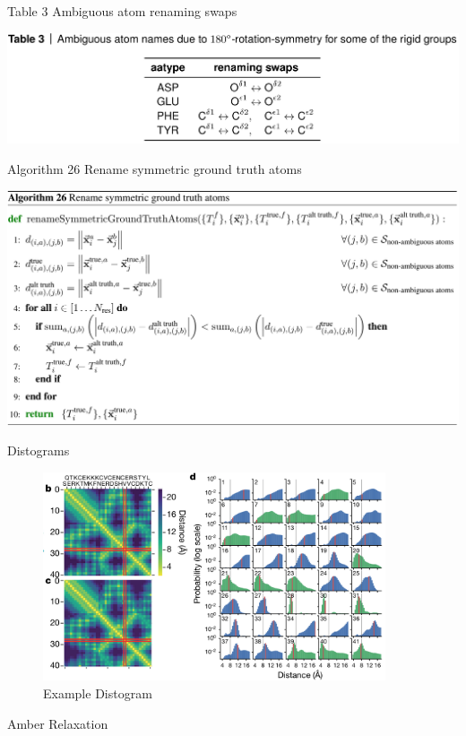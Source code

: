 \documentclass[presentation, smaller]{beamer}
\begin{document}
\begin{frame}[label={sec:orge876001}]{Table 3 Ambiguous atom renaming swaps \cite{jumperHighlyAccurateProtein2021}}
\begin{center}
\includegraphics[width=\textwidth]{./imgs/table3_atom_renaming.png}
\end{center}
\end{frame}

\begin{frame}[label={sec:org96c8ffd}]{Algorithm 26 Rename symmetric ground truth atoms \cite{jumperHighlyAccurateProtein2021}}
\begin{center}
\includegraphics[width=.9\linewidth]{./imgs/algo26_rename-truth-atoms.png}
\end{center}
\end{frame}
\begin{frame}[label={sec:orgd19777b}]{Distograms \cite{jumperHighlyAccurateProtein2021}}
\begin{figure}[htbp]
\centering
\includegraphics[width=0.9\textwidth]{./imgs/distogram_example.png}
\caption{Example Distogram \protect\cite{seniorImprovedProteinStructure2020}}
\end{figure}
\end{frame}
\begin{frame}[label={sec:org598b501}]{Amber Relaxation}
\end{frame}
\end{document}
